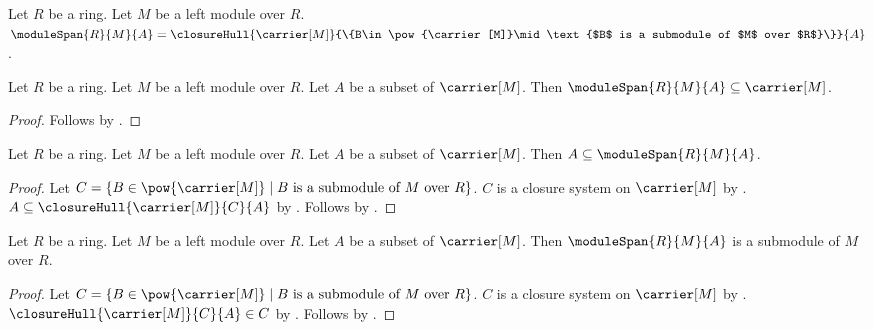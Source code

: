 \begin{definition}\label{module_span}
    Let $R$ be a ring.
    Let $M$ be a left module over $R$.
    $\moduleSpan{R}{M}{A}=
        \closureHull{\carrier[M]}
            {\{B\in\pow{\carrier[M]}\mid
                \text{$B$ is a submodule of $M$ over $R$}\}}
            {A}$.
\end{definition}

\begin{proposition}\label{module_span_subseteq_carrier}
    Let $R$ be a ring.
    Let $M$ be a left module over $R$.
    Let $A$ be a subset of $\carrier[M]$.
    Then $\moduleSpan{R}{M}{A}\subseteq\carrier[M]$.
\end{proposition}
\begin{proof}
    Follows by .
\end{proof}

\begin{proposition}\label{module_span_contains_generators}
    Let $R$ be a ring.
    Let $M$ be a left module over $R$.
    Let $A$ be a subset of $\carrier[M]$.
    Then $A\subseteq\moduleSpan{R}{M}{A}$.
\end{proposition}
\begin{proof}
    Let
        $C=\{B\in\pow{\carrier[M]}\mid
            \text{$B$ is a submodule of $M$ over $R$}\}$.
    $C$ is a closure system on $\carrier[M]$ by
        .
    $A\subseteq\closureHull{\carrier[M]}{C}{A}$ by
        .
    Follows by .
\end{proof}

\begin{theorem}\label{module_span_is_submodule}
    Let $R$ be a ring.
    Let $M$ be a left module over $R$.
    Let $A$ be a subset of $\carrier[M]$.
    Then $\moduleSpan{R}{M}{A}$ is a submodule of $M$ over $R$.
\end{theorem}
\begin{proof}
    Let
        $C=\{B\in\pow{\carrier[M]}\mid
            \text{$B$ is a submodule of $M$ over $R$}\}$.
    $C$ is a closure system on $\carrier[M]$ by
        .
    $\closureHull{\carrier[M]}{C}{A}\in C$ by
        .
    Follows by .
\end{proof}

